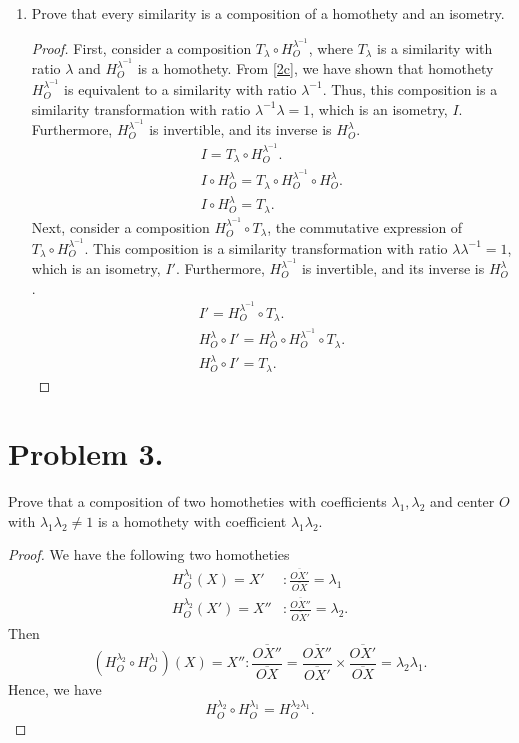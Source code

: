 \documentclass{article}
\begin{document}
\begin{enumerate}[label=(\alph*)]
\begin{proof}
\begin{enumerate}[label=(\alph*)]
        Thus, homothety $H_O^{\lambda}$ is equivalent to a similarity of ratio $\lambda$.
    \end{enumerate}
    \end{proof}
    \item Prove that every similarity is a composition of a homothety and an isometry.
    \begin{proof}
    First, consider a composition $T_{\lambda}\circ H_O^{\lambda^{-1}}$, where $T_{\lambda}$ is a similarity with ratio $\lambda$ and $H_O^{\lambda^{-1}}$ is a homothety. From \ref{2c}, we have shown that homothety $H_O^{\lambda^{-1}}$ is equivalent to a similarity with ratio $\lambda^{-1}$. Thus, this composition is a similarity transformation with ratio $\lambda^{-1}\lambda=1$, which is an isometry, $I$. Furthermore, $H_O^{\lambda^{-1}}$ is invertible, and its inverse is $H_O^{\lambda}$.
    \begin{align*}
        I=T_{\lambda}\circ H_O^{\lambda^{-1}}.\\
        I\circ H_O^{\lambda}=T_{\lambda}\circ H_O^{\lambda^{-1}}\circ H_O^{\lambda}.\\
        I\circ H_O^{\lambda}=T_{\lambda}.
    \end{align*}
    Next, consider a composition $H_O^{\lambda^{-1}}\circ T_{\lambda}$, the commutative expression of $T_{\lambda}\circ H_O^{\lambda^{-1}}$. This composition is a similarity transformation with ratio $\lambda\lambda^{-1}=1$, which is an isometry, $I'$. Furthermore, $H_O^{\lambda^{-1}}$ is invertible, and its inverse is $H_O^{\lambda}$.
    \begin{align*}
        I'=H_O^{\lambda^{-1}}\circ T_{\lambda}.\\
        H_O^{\lambda}\circ I' =H_O^{\lambda}\circ H_O^{\lambda^{-1}}\circ T_{\lambda}.\\
        H_O^{\lambda}\circ I'=T_{\lambda}.
    \end{align*}
    \end{proof}
\end{enumerate}


\section{Problem 3.}
Prove that a composition of two homotheties with coefficients $\lambda_1, \lambda_2$ and center $O$ with $\lambda_1 \lambda_2 \neq 1$ is a homothety with coefficient $\lambda_1 \lambda_2.$
\begin{proof}
We have the following two homotheties
\begin{align*}
    H_O^{\lambda_1}(X)=X'&:\frac{\overline{OX'}}{\overline{OX}}=\lambda_1\\
    H_O^{\lambda_2}(X')=X''&:\frac{\overline{OX''}}{\overline{OX'}}=\lambda_2.
\end{align*}
Then
\[(H_O^{\lambda_2}\circ H_O^{\lambda_1})(X)=X'':\frac{\overline{OX''}}{\overline{OX}}=\frac{\overline{OX''}}{\overline{OX'}}\times \frac{\overline{OX'}}{\overline{OX}}=\lambda_2\lambda_1.\]
Hence, we have
\[H_O^{\lambda_2}\circ H_O^{\lambda_1}=H_O^{\lambda_2\lambda_1}.\]
\end{proof}
\end{document}
